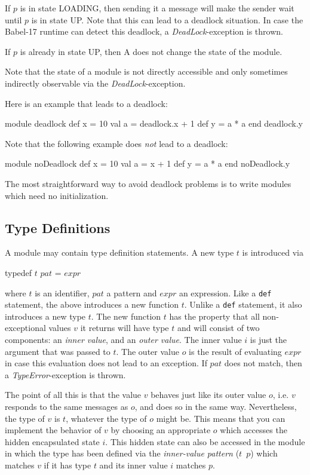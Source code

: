\documentclass[11pt]{amsart}
\newcommand{\babelsrc}[1] {\lstinline!#1!}
\begin{document}
If $p$ is in state LOADING, then sending it a message will make the sender wait until $p$ is in state UP. Note that this can lead to a deadlock situation. In case the Babel-17 runtime can detect this deadlock, a \emph{DeadLock}-exception is thrown. 

If $p$ is already in state UP, then A does not change the state of the module. 

Note that the state of a module is not directly accessible and only sometimes indirectly observable via the \emph{DeadLock}-exception.

Here is an example that leads to a deadlock:
\begin{babellisting}
module deadlock
  def x = 10
  val a = deadlock.x + 1
  def y = a * a
end
deadlock.y
\end{babellisting}
Note that the following example does \emph{not} lead to a deadlock:
\begin{babellisting}
module noDeadlock
  def x  = 10
  val a = x + 1
  def y = a * a
end
noDeadlock.y
\end{babellisting}
The most straightforward way to avoid deadlock problems is to write modules which need no initialization. 

\subsection{Type Definitions}\label{sec:typedefs}
A module may contain type definition statements. A new type $t$ is introduced via
\begin{babellisting}
typedef $t$ $pat$ = $expr$
\end{babellisting}
where $t$ is an identifier, $pat$ a pattern and $expr$ an expression. Like a \babelsrc{def} statement, the above introduces a new function $t$. Unlike a \babelsrc{def} statement, it also introduces a new type $t$. The new function $t$ has the property that all non-exceptional values $v$ it returns will have type $t$ and will consist of two components: an \emph{inner value}, and an \emph{outer value}. The inner value $i$ is just the argument that was passed to $t$. The outer value $o$ is the result of evaluating $expr$ in case this evaluation does not lead to an exception. If $pat$ does not match, then a \emph{TypeError}-exception is thrown. 

The point of all this is that the value $v$ behaves just like its outer value $o$, i.e. $v$ responds to the same messages as $o$, and does so in the same way. Nevertheless, the type of $v$ is $t$, whatever the type of $o$ might be. This means that you can implement the behavior of $v$ by choosing an appropriate $o$ which accesses the hidden encapsulated state $i$. This hidden state can also be accessed in the module in which the type has been defined via the \emph{inner-value pattern} ($t$\ $p$) which matches $v$ if it has type $t$ and its inner value $i$ matches $p$.
\end{document}
